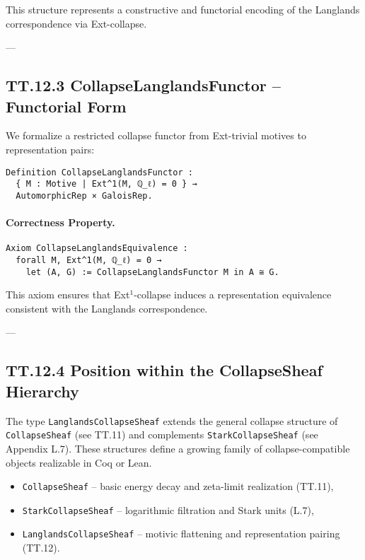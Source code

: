 \documentclass[11pt]{article}
\begin{document}
{This structure represents a constructive and functorial encoding of the Langlands correspondence via Ext-collapse.

---

\subsection*{TT.12.3 CollapseLanglandsFunctor – Functorial Form}

We formalize a restricted collapse functor from Ext-trivial motives to representation pairs:

\begin{verbatim}
Definition CollapseLanglandsFunctor :
  { M : Motive | Ext^1(M, ℚ_ℓ) = 0 } →
  AutomorphicRep × GaloisRep.
\end{verbatim}

\paragraph{Correctness Property.}
\begin{verbatim}
Axiom CollapseLanglandsEquivalence :
  forall M, Ext^1(M, ℚ_ℓ) = 0 →
    let (A, G) := CollapseLanglandsFunctor M in A ≅ G.
\end{verbatim}

This axiom ensures that Ext$^1$-collapse induces a representation equivalence consistent with the Langlands correspondence.

---

\subsection*{TT.12.4 Position within the CollapseSheaf Hierarchy}

The type \texttt{LanglandsCollapseSheaf} extends the general collapse structure of \texttt{CollapseSheaf} (see TT.11)  
and complements \texttt{StarkCollapseSheaf} (see Appendix L.7). These structures define a growing family of  
collapse-compatible objects realizable in Coq or Lean.

\begin{itemize}
  \item \texttt{CollapseSheaf} – basic energy decay and zeta-limit realization (TT.11),
  \item \texttt{StarkCollapseSheaf} – logarithmic filtration and Stark units (L.7),
  \item \texttt{LanglandsCollapseSheaf} – motivic flattening and representation pairing (TT.12).
\end{itemize}

}
\end{document}
